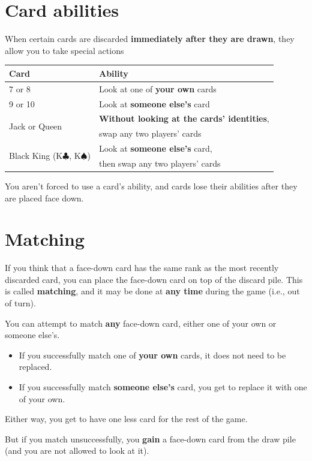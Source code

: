 \documentclass[12pt]{article}
\newcommand{\club}{$\clubsuit$}
\newcommand{\spade}{$\spadesuit$}
\begin{document}
\section{Card abilities}\label{abilities}
When certain cards are discarded \textbf{immediately after they are drawn}, they allow you to take special actions
\begin{table}[H]
\centering
\begin{tabular}{|l|p{3.25in}|}
\hline
Card & Ability \\
\hline
7 or 8 & Look at one of \textbf{your own} cards\\
\hline
9 or 10 & Look at \textbf{someone else's} card \\
\hline
\multirow{2}{*}{Jack or Queen} & \textbf{Without looking at the cards' identities}, \\
& swap any two players' cards \\
\hline
\multirow{2}{*}{Black King (K\club, K\spade)} & Look at \textbf{someone else's} card, \\
& then swap any two players' cards\\
\hline
\end{tabular}
\end{table}
You aren't forced to use a card's ability, and cards lose their abilities after they are placed face down.


\section{Matching}
If you think that a face-down card has the same rank as the most recently discarded card, you can place the face-down card on top of the discard pile. This is called \textbf{matching}, and it may be done at \textbf{any time} during the game (i.e., out of turn). 

You can attempt to match \textbf{any} face-down card, either one of your own or someone else's.
\begin{itemize}
\item If you successfully match one of \textbf{your own} cards, it does not need to be replaced.
\item If you successfully match \textbf{someone else's} card, you get to replace it with one of your own.
\end{itemize}
Either way, you get to have one less card for the rest of the game.

But if you match unsuccessfully, you \textbf{gain} a face-down card from the draw pile (and you are not allowed to look at it).
\end{document}
